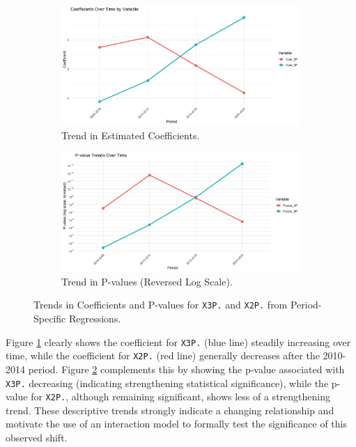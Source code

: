 \documentclass[11pt, a4paper]{article} %
\begin{document}
\begin{figure}[htbp] 
    \centering
    \begin{subfigure}{0.48\textwidth}
        \includegraphics[width=\linewidth]{figure/Coefficients Over Time by Variable.jpg} %
        \caption{Trend in Estimated Coefficients.}
        \label{fig:coef_trends}
    \end{subfigure}\hfill
    \begin{subfigure}{0.48\textwidth}
        \includegraphics[width=\linewidth]{figure/P-value Trends Over Time.jpg} %
        \caption{Trend in P-values (Reversed Log Scale).}
        \label{fig:pval_trends}
    \end{subfigure}
    \caption{Trends in Coefficients and P-values for \texttt{X3P.} and \texttt{X2P.} from Period-Specific Regressions.}
    \label{fig:trends}
\end{figure}

Figure \ref{fig:coef_trends} clearly shows the coefficient for \texttt{X3P.} (blue line) steadily increasing over time, 
while the coefficient for \texttt{X2P.} (red line) generally decreases after the 2010-2014 period. Figure \ref{fig:pval_trends} 
complements this by showing the p-value associated with \texttt{X3P.} decreasing (indicating strengthening statistical significance), 
while the p-value for \texttt{X2P.}, although remaining significant, shows less of a strengthening trend. These descriptive trends 
strongly indicate a changing relationship and motivate the use of an interaction model to formally test the significance of 
this observed shift.
\end{document}
